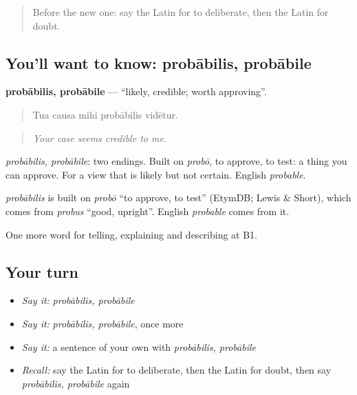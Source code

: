 \label{lesson:LA-C359-probabilis}



\begin{quote}
Before the new one: say the Latin for to deliberate, then the Latin for doubt.
\end{quote}

\subsection*{You'll want to know: probābilis, probābile}
\textbf{probābilis, probābile} — \textquotedblleft{}likely, credible; worth approving\textquotedblright{}.

\begin{quote}
Tua causa mihi probābilis vidētur.
\end{quote}

\begin{quote}
\emph{Your case seems credible to me.}
\end{quote}

\emph{probābilis, probābile}: two endings. Built on \emph{probō}, to approve, to test: a thing you can approve. For a view that is likely but not certain. English \emph{probable}.

\begin{cousinweb}
\emph{probābilis} is built on \emph{probō} \textquotedblleft{}to approve, to test\textquotedblright{} (EtymDB; Lewis \& Short), which comes from \emph{probus} \textquotedblleft{}good, upright\textquotedblright{}. English \emph{probable} comes from it.
\end{cousinweb}

\begin{grammarlens}[title={What you've built}]
One more word for telling, explaining and describing at B1.
\end{grammarlens}

\subsection*{Your turn}
\begin{itemize}
\raggedright
  \item \emph{Say it:} \emph{probābilis, probābile}
  \item \emph{Say it:} \emph{probābilis, probābile}, once more
  \item \emph{Say it:} a sentence of your own with \emph{probābilis, probābile}
  \item \emph{Recall:} say the Latin for to deliberate, then the Latin for doubt, then say \emph{probābilis, probābile} again
\end{itemize}

